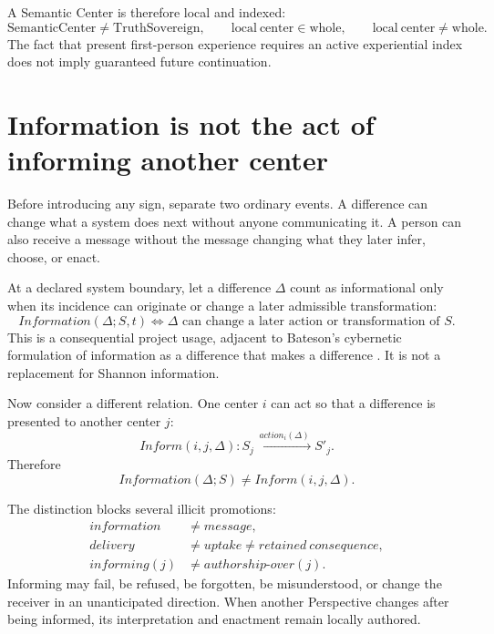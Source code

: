 \documentclass[11pt]{article}
\begin{document}
A Semantic Center is therefore local and indexed:
\begin{equation}
\mathrm{SemanticCenter}\neq\mathrm{TruthSovereign},\qquad
\mathrm{local\ center}\in\mathrm{whole},\qquad
\mathrm{local\ center}\neq\mathrm{whole}.
\end{equation}
The fact that present first-person experience requires an active experiential index does not imply guaranteed future continuation.


\section{Information is not the act of informing another center}
\label{sec:information-informing}

Before introducing any sign, separate two ordinary events. A difference can change what a system does next without anyone communicating it. A person can also receive a message without the message changing what they later infer, choose, or enact.

At a declared system boundary, let a difference $\Delta$ count as informational only when its incidence can originate or change a later admissible transformation:
\begin{equation}
Information(\Delta;S,t)
\Longleftrightarrow
\Delta\text{ can change a later action or transformation of }S.
\end{equation}
This is a consequential project usage, adjacent to Bateson's cybernetic formulation of information as a difference that makes a difference \cite{Bateson1972}. It is not a replacement for Shannon information.

Now consider a different relation. One center $i$ can act so that a difference is presented to another center $j$:
\begin{equation}
Inform(i,j,\Delta):
S_j \xrightarrow{\,action_i(\Delta)\,} S'_j.
\end{equation}
Therefore
\begin{equation}
\boxed{Information(\Delta;S)\neq Inform(i,j,\Delta).}
\end{equation}

The distinction blocks several illicit promotions:
\begin{equation}
\begin{aligned}
information&\neq message,\\
delivery&\neq uptake\neq retained\ consequence,\\
informing(j)&\neq authorship\text{-}over(j).
\end{aligned}
\end{equation}
Informing may fail, be refused, be forgotten, be misunderstood, or change the receiver in an unanticipated direction. When another Perspective changes after being informed, its interpretation and enactment remain locally authored.
\end{document}
